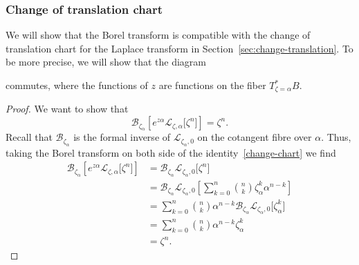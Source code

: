 \documentclass{article}
\newcommand{\C}{\mathbb{C}}
\newcommand{\laplace}{\mathcal{L}}
\newcommand{\borel}{\mathcal{B}}
\theoremstyle{definition}
\theoremstyle{plain}
\begin{document}
\subsubsection{Change of translation chart}\label{transl-borel}
We will show that the Borel transform is compatible with the change of translation chart for the Laplace transform in Section~\ref{sec:change-translation}. To be more precise, we will show that the diagram
\begin{center}
\end{center}
commutes, where the functions of $z$ are functions on the fiber $T^*_{\zeta=\alpha}B$. 
\begin{proof}
We want to show that 
\[\borel_{\zeta_\alpha}\left[e^{z\alpha} \laplace_{\zeta,\alpha}\big[\zeta^n\big]\right]=\zeta^n.\]
Recall that $\borel_{\zeta_\alpha}$
is the formal inverse of $\laplace_{\zeta_\alpha,0}$ on the cotangent fibre over $\alpha$. Thus, taking the Borel transform on both side of the identity~\eqref{change-chart} we find
  \begin{align*}
      \borel_{\zeta_\alpha}\left[e^{z\alpha} \laplace_{\zeta,\alpha}\big[\zeta^n\big]\right]&=\borel_{\zeta_\alpha}\laplace_{\zeta_\alpha,0}\big[\zeta^n\big]\\
      &=\borel_{\zeta_\alpha}\laplace_{\zeta_\alpha,0}\left[\sum_{k=0}^n{n\choose k}\zeta_\alpha^k \alpha^{n-k}\right]\\
      &=\sum_{k=0}^n{n\choose k} \alpha^{n-k}\borel_{\zeta_\alpha}\laplace_{\zeta_\alpha,0}\big[\zeta_\alpha^k \big]\\
      &=\sum_{k=0}^n{n\choose k} \alpha^{n-k}\zeta_\alpha^k\\
      &=\zeta^n.
  \end{align*}
\end{proof}
\end{document}
